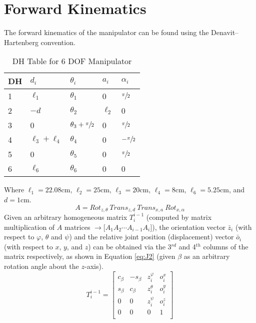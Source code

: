 \documentclass[12pt]{report}
\begin{document}
\section{Forward Kinematics}
The forward kinematics of the manipulator can be found using the Denavit–Hartenberg convention. \\
\begin{table}[htp]
  \center
  \caption{DH Table for 6 DOF Manipulator}
  \label{table:dh}
  \begin{tabular}{C{1cm}|C{1.5cm}|C{2cm}|C{1cm}|C{1cm}}
    DH & $d_i$ & $\theta_i$ & $a_i$ & $\alpha_i$ \\  & $\ell_1$ & $\theta_1$ & 0 & $\sfrac{\pi}{2}$ \\
    2 & $-d$ & $\theta_2$ & $\ell_2$ & 0 \\
    3 & 0 & $\theta_3 + \sfrac{\pi}{2}$ & 0 & $\sfrac{\pi}{2}$ \\
    4 & $\ell_3 + \ell_4$ & $\theta_4$ & 0 & $-\sfrac{\pi}{2}$ \\
    5 & 0 & $\theta_5$ & 0 & $\sfrac{\pi}{2}$ \\
    6 & $\ell_6$ & $\theta_6$ & 0 & 0 \\
  \end{tabular}
\end{table}
Where \(\ell_1 = 22.08\)cm, \(\ell_2 = 25\)cm, \(\ell_3 = 20\)cm, \(\ell_4 = 8\)cm, \(\ell_6 = 5.25\)cm, and \(d = 1\)cm.
\begin{equation}
A = Rot_{z,\theta}~Trans_{z,d}~Trans_{x,a}~Rot_{x,\alpha}
\label{eq:J1}
\end{equation}%
Given an arbitrary homogeneous matrix $T_i^{i-1}$ (computed by matrix multiplication of $A$ matrices $\rightarrow \big[A_1A_2\cdots A_{i-1}A_i\big]$), the orientation vector $\bar{z}_i$ (with respect to $\varphi$, $\theta$ and $\psi$) and the relative joint position (displacement) vector $\bar{o}_i$ (with respect to $x$, $y$, and $z$) can be obtained via the 3$^{rd}$ and 4$^{th}$ columns of the matrix respectively,
as shown in Equation \ref{eq:J2} (given $\beta$ as an arbitrary rotation angle about the $z$-axis).
\begin{equation}
  T_i^{i-1} =
\begin{bmatrix}
  c_{\beta} & -s_{\beta} & z_i^{\varphi} & o_i^x \\
  s_{\beta} & c_{\beta} & z_i^{\theta} & o_i^y \\
  0 & 0 & z_i^{\psi} & o_i^z \\
  0 & 0 & 0 & 1 \\
\end{bmatrix}
\label{eq:J2}
\end{equation}
\end{document}
